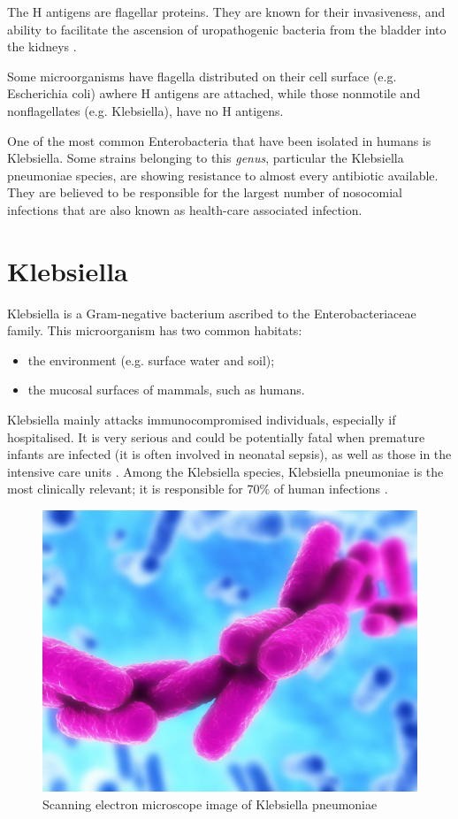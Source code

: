 \documentclass[11pt]{report}
\begin{document}
The H antigens are flagellar proteins. They are known for their invasiveness, and ability to facilitate the ascension of uropathogenic bacteria from the bladder into the kidneys \cite{wiles2008origins}.

Some microorganisms have flagella distributed on their cell surface (e.g. Escherichia coli) awhere H antigens are attached, while those nonmotile and nonflagellates (e.g. Klebsiella), have no H antigens.

One of the most common Enterobacteria that have been isolated in humans is Klebsiella.
Some strains belonging to this \emph{genus}, particular the Klebsiella pneumoniae species, are showing resistance to almost every antibiotic available. 
They are believed to be responsible for the largest number of nosocomial infections that are also known as health-care associated infection.

\clearpage
\section{Klebsiella}
Klebsiella is a Gram-negative bacterium ascribed to the Enterobacteriaceae family.
This microorganism has two common habitats: 

\begin{itemize}
\item the environment (e.g. surface water and soil);
\item the mucosal surfaces of mammals, such as humans.
\end{itemize}

Klebsiella mainly attacks immunocompromised individuals, especially if hospitalised.
It is very serious and could be potentially fatal when premature infants are infected (it is often involved in neonatal sepsis), as well as those in the intensive care units \cite{podschun1998klebsiella}.
Among the Klebsiella species, Klebsiella pneumoniae is the most clinically relevant; it is responsible for 70$\%$ of human infections \cite{Pitout2015}.

\begin{figure}[htp]
\centering
\includegraphics[scale=0.30]{img/Klebsiella_pneumoniae.jpg}
\caption{Scanning electron microscope image of Klebsiella pneumoniae}
\label{}
\end{figure}
\end{document}
